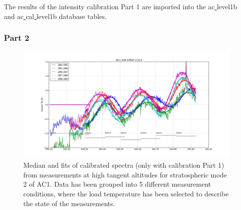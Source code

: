 \documentclass[12pt]{article}
\begin{document}
The results of the intensity calibration Part 1 
are imported into the ac\underline{ }level1b and  
ac\underline{ }cal\underline{ }level1b database tables.


\clearpage
\newpage 

\subsubsection{Part 2}
\label{sec:part2}
\begin{figure}[!t]
\centering
\includegraphics[scale=0.35]{figures/ac1_544_strat2.png}
\caption{Median and fits of calibrated spectra 
(only with calibration Part 1) from 
measurements at high tangent altitudes
 for stratospheric mode 2 of AC1. Data has been grouped into 5 different 
 measurement conditions, where the load
 temperature has been selected to describe the state of the measurements.}
\label{fig:ac1}
\end{figure}
\end{document}
